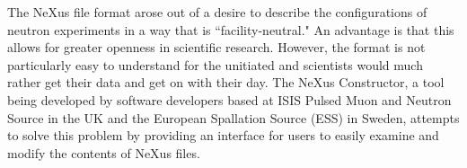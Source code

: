 The NeXus file format arose out of a desire to describe the configurations of neutron experiments in a way that is ``facility-neutral." An advantage is that this allows for greater openness in scientific research. However, the format is not particularly easy to understand for the unitiated and scientists would much rather get their data and get on with their day. The NeXus Constructor, a tool being developed by software developers based at ISIS Pulsed Muon and Neutron Source in the UK and the European Spallation Source (ESS) in Sweden, attempts to solve this problem by providing an interface for users to easily examine and modify the contents of NeXus files.

